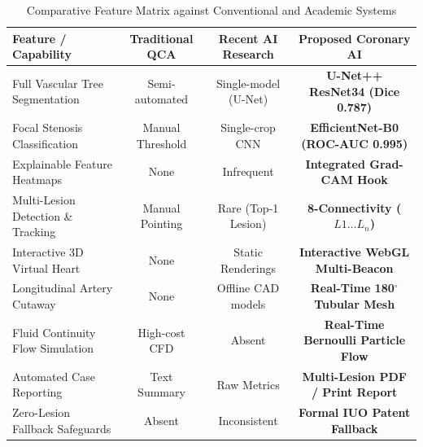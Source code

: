 \begin{table}[H]
\centering
\caption{Comparative Feature Matrix against Conventional and Academic Systems}
\label{tab:system_comparison}
\small
\begin{tabular}{p{4.5cm}ccc}
\toprule
\textbf{Feature / Capability} & \textbf{Traditional QCA} & \textbf{Recent AI Research} & \textbf{Proposed Coronary AI} \\
\midrule
Full Vascular Tree Segmentation & Semi-automated & Single-model (U-Net) & \textbf{U-Net++ ResNet34 (Dice 0.787)} \\
Focal Stenosis Classification & Manual Threshold & Single-crop CNN & \textbf{EfficientNet-B0 (ROC-AUC 0.995)} \\
Explainable Feature Heatmaps & None & Infrequent & \textbf{Integrated Grad-CAM Hook} \\
Multi-Lesion Detection \& Tracking & Manual Pointing & Rare (Top-1 Lesion) & \textbf{8-Connectivity ($L1 \dots L_n$)} \\
Interactive 3D Virtual Heart & None & Static Renderings & \textbf{Interactive WebGL Multi-Beacon} \\
Longitudinal Artery Cutaway & None & Offline CAD models & \textbf{Real-Time 180$^\circ$ Tubular Mesh} \\
Fluid Continuity Flow Simulation & High-cost CFD & Absent & \textbf{Real-Time Bernoulli Particle Flow} \\
Automated Case Reporting & Text Summary & Raw Metrics & \textbf{Multi-Lesion PDF / Print Report} \\
Zero-Lesion Fallback Safeguards & Absent & Inconsistent & \textbf{Formal IUO Patent Fallback} \\
\bottomrule
\end{tabular}
\end{table}
